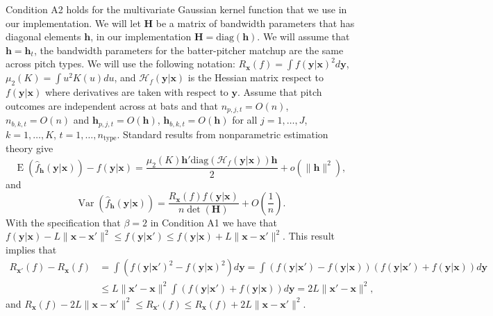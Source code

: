 \documentclass[12pt]{article}
\newcommand{\Hcal}{\mathcal{H}}
\newcommand{\Hbf}{\textbf{H}}
\newcommand{\y}{\textbf{y}}
\newcommand{\x}{\textbf{x}}
\newcommand{\h}{\textbf{h}}
\DeclareMathOperator{\E}{E}
\DeclareMathOperator{\Var}{Var}
\begin{document}
Condition A2 holds for the multivariate Gaussian kernel function that we use in our implementation. We will let $\Hbf$ be a matrix of bandwidth parameters that has diagonal elements $\h$, in our implementation $\Hbf = \text{diag}(\h)$. We will assume that $\h = \h_t$, the bandwidth parameters for the batter-pitcher matchup are the same across pitch types. We will use the following notation: $R_{\x}(f) = \int f(\y|\x)^2 d\y$, $\mu_2(K) = \int u^2K(u)du$, and $\Hcal_f(\y|\x)$ is the Hessian matrix respect to $f(\y|\x)$ where derivatives are taken with respect to $\y$. Assume that pitch outcomes are independent across at bats and that $n_{p,j,t} = O(n)$, $n_{b,k,t} = O(n)$ and $\h_{p,j,t} = O(\h)$, $\h_{b,k,t} = O(\h)$ for all $j = 1, \ldots, J$, $k = 1, \ldots, K$, $t = 1,\ldots,n_{\text{type}}$. Standard results from nonparametric estimation theory give
$$
  \E(\hat f_\h(\y|\x)) - f(\y|\x) = \frac{\mu_2(K)\h'\text{diag}(\Hcal_f(\y|\x))\h}{2}
    + o(\|\h\|^2),
$$
and
$$
 \Var(\hat f_\h(\y|\x)) = \frac{R_{\x}(f)f(\y|\x)}{n\det(\Hbf)} + O\left(\frac{1}{n}\right).
$$
With the specification that $\beta = 2$ in Condition A1 we have that
$
   f(\y|\x) - L\|\x-\x'\|^2 \leq f(\y|\x') \leq f(\y|\x) + L\|\x-\x'\|^2.
$
This result implies that
\begin{align*}
  R_{\x'}(f) - R_\x(f) &= \int (f(\y|\x')^2 - f(\y|\x)^2) d\y
     = \int (f(\y|\x') - f(\y|\x))(f(\y|\x') + f(\y|\x)) d\y \\
  &\leq L\|\x'-\x\|^2 \int(f(\y|\x') + f(\y|\x)) d\y
    = 2L\|\x'-\x\|^2,
\end{align*}
and
$
   R_\x(f) - 2L\|\x-\x'\|^2 \leq R_{\x'}(f) \leq R_\x(f) + 2L\|\x-\x'\|^2.
$
\end{document}
